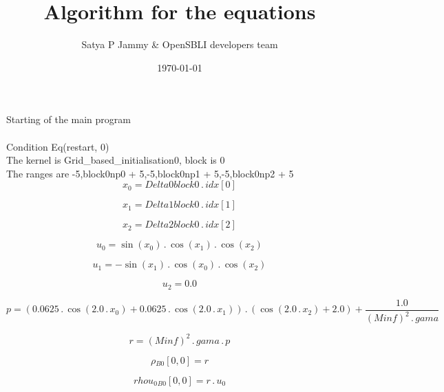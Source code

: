 \documentclass{article}
\title{Algorithm for the equations}
\author{Satya P Jammy \& OpenSBLI developers team}
\date{\today}
\begin{document}
\maketitle
\noindent Starting of the main program\\
\\\noindent Condition Eq(restart, 0)\\\noindent The kernel is Grid_based_initialisation0, block is 0\\\noindent The ranges are -5,block0np0 + 5,-5,block0np1 + 5,-5,block0np2 + 5\\\begin{dmath}x_{0} = Delta0block0 \,.\, {idx}[{0}]\end{dmath}

\begin{dmath}x_{1} = Delta1block0 \,.\, {idx}[{1}]\end{dmath}

\begin{dmath}x_{2} = Delta2block0 \,.\, {idx}[{2}]\end{dmath}

\begin{dmath}u_{0} = \sin{\left (x_{0} \right )} \,.\, \cos{\left (x_{1} \right )} \,.\, \cos{\left (x_{2} \right )}\end{dmath}

\begin{dmath}u_{1} = - \sin{\left (x_{1} \right )} \,.\, \cos{\left (x_{0} \right )} \,.\, \cos{\left (x_{2} \right )}\end{dmath}

\begin{dmath}u_{2} = 0.0\end{dmath}

\begin{dmath}p = \left(0.0625 \,.\, \cos{\left (2.0 \,.\, x_{0} \right )} + 0.0625 \,.\, \cos{\left (2.0 \,.\, x_{1} \right )}\right) \,.\, \left(\cos{\left (2.0 \,.\, x_{2} \right )} + 2.0\right) + \frac{1.0}{\left(Minf \right)^{2} \,.\, 
gama}\end{dmath}

\begin{dmath}r = \left(Minf \right)^{2} \,.\, gama \,.\, p\end{dmath}

\begin{dmath}{\rho{_{B0}}}[{0,0}] = r\end{dmath}

\begin{dmath}{rhou_{0}{_{B0}}}[{0,0}] = r \,.\, u_{0}\end{dmath}
\end{document}
